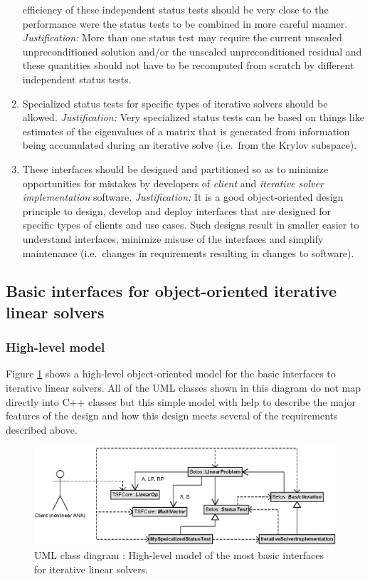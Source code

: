 \documentclass[pdf,ps2pdf,11pt]{SANDreport}
\begin{document}
\begin{enumerate}
efficiency of these independent status tests should be very close to
the performance were the status tests to be combined in more careful
manner.  {}\textit{Justification:} More than one status test may
require the current unscaled unpreconditioned solution and/or the
unscaled unpreconditioned residual and these quantities should not
have to be recomputed from scratch by different independent status
tests.
\item
Specialized status tests for specific types of iterative solvers
should be allowed.  {}\textit{Justification:} Very specialized status
tests can be based on things like estimates of the eigenvalues of a
matrix that is generated from information being accumulated during an
iterative solve (i.e.~from the Krylov subspace).
\item
These interfaces should be designed and partitioned so as to minimize
opportunities for mistakes by developers of {}\textit{client} and
{}\textit{iterative solver implementation} software.
{}\textit{Justification:} It is a good object-oriented design
principle to design, develop and deploy interfaces that are designed
for specific types of clients and use cases.  Such designs result in
smaller easier to understand interfaces, minimize misuse of the
interfaces and simplify maintenance (i.e.~changes in requirements
resulting in changes to software).
\end{enumerate}

\subsection{Basic interfaces for object-oriented iterative linear solvers}

\subsubsection{High-level model}

Figure {}\ref{belos:fig:BelosInterfacesSimple} shows a high-level
object-oriented model for the basic interfaces to iterative linear
solvers.  All of the UML classes shown in this diagram do not map
directly into C++ classes but this simple model with help to describe
the major features of the design and how this design meets several of
the requirements described above.

{\bsinglespace
\begin{figure}[t]
\begin{center}
\includegraphics*[scale=0.85]{BelosInterfacesSimple}
\end{center}
\caption{
\label{belos:fig:BelosInterfacesSimple}
UML class diagram : High-level model of
the most basic interfaces for iterative linear solvers.}
\end{figure}
\esinglespace}
\end{document}
